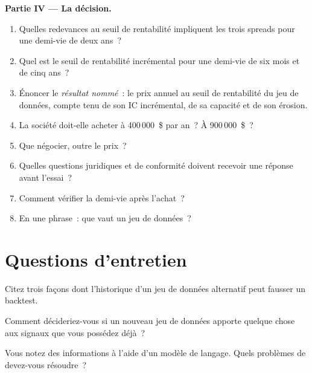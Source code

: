\begin{problem}
\medskip\noindent\textbf{Partie IV --- La décision.}
\begin{enumerate}[resume]
\item Quelles redevances au seuil de rentabilité impliquent les trois spreads pour une demi-vie de deux ans~?
\item Quel est le seuil de rentabilité incrémental pour une demi-vie de six mois et de cinq ans~?
\item Énoncer le \emph{résultat nommé}~: le prix annuel au seuil de rentabilité du jeu de données, compte tenu de son IC incrémental, de sa capacité et de son érosion.
\item La société doit-elle acheter à 400\,000~\$ par an~? À 900\,000~\$~?
\item Que négocier, outre le prix~?
\item Quelles questions juridiques et de conformité doivent recevoir une réponse avant l'essai~?
\item Comment vérifier la demi-vie après l'achat~?
\item En une phrase~: que vaut un jeu de données~?
\end{enumerate}
\end{problem}

\section{Questions d'entretien}

\begin{interviewq}\label{iq:rs:alternative-and-text-data:1}
Citez trois façons dont l'historique d'un jeu de données alternatif peut fausser un backtest.
\end{interviewq}

\begin{interviewq}\label{iq:rs:alternative-and-text-data:2}
Comment décideriez-vous si un nouveau jeu de données apporte quelque chose aux signaux que vous possédez déjà~?
\end{interviewq}

\begin{interviewq}\label{iq:rs:alternative-and-text-data:3}
Vous notez des informations à l'aide d'un modèle de langage. Quels problèmes de  devez-vous résoudre~?
\end{interviewq}

